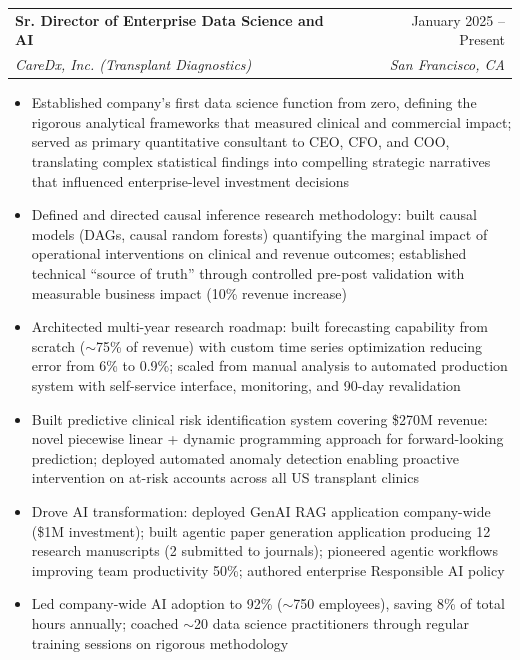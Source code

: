 \documentclass[letterpaper,11pt]{article}
\makeatletter
\newcommand{\resumeItem}[1]{
  \item\small{
    {#1 \vspace{-2pt}}
  }
}
\newcommand{\resumeSubheading}[4]{
  \vspace{-2pt}\item
    \begin{tabular*}{0.97\textwidth}[t]{l@{\extracolsep{\fill}}r}
      \textbf{#1} & #2 \\
      \textit{\small#3} & \textit{\small #4} \\
    \end{tabular*}\vspace{-7pt}
}
\newcommand{\resumeItemListStart}{\begin{itemize}}
\newcommand{\resumeItemListEnd}{\end{itemize}\vspace{-5pt}}
\makeatother
\begin{document}
    \resumeSubheading
      {Sr. Director of Enterprise Data Science and AI}{January 2025 -- Present}
      {CareDx, Inc. (Transplant Diagnostics)}{San Francisco, CA}
      \resumeItemListStart
        \resumeItem{Established company's first data science function from zero, defining the rigorous analytical frameworks that measured clinical and commercial impact; served as primary quantitative consultant to CEO, CFO, and COO, translating complex statistical findings into compelling strategic narratives that influenced enterprise-level investment decisions}
        \resumeItem{Defined and directed causal inference research methodology: built causal models (DAGs, causal random forests) quantifying the marginal impact of operational interventions on clinical and revenue outcomes; established technical ``source of truth'' through controlled pre-post validation with measurable business impact (10\% revenue increase)}
        \resumeItem{Architected multi-year research roadmap: built forecasting capability from scratch ($\sim$75\% of revenue) with custom time series optimization reducing error from 6\% to 0.9\%; scaled from manual analysis to automated production system with self-service interface, monitoring, and 90-day revalidation}
        \resumeItem{Built predictive clinical risk identification system covering \$270M revenue: novel piecewise linear + dynamic programming approach for forward-looking prediction; deployed automated anomaly detection enabling proactive intervention on at-risk accounts across all US transplant clinics}
        \resumeItem{Drove AI transformation: deployed GenAI RAG application company-wide (\$1M investment); built agentic paper generation application producing 12 research manuscripts (2 submitted to journals); pioneered agentic workflows improving team productivity 50\%; authored enterprise Responsible AI policy}
        \resumeItem{Led company-wide AI adoption to 92\% ($\sim$750 employees), saving 8\% of total hours annually; coached $\sim$20 data science practitioners through regular training sessions on rigorous methodology}
      \resumeItemListEnd
\end{document}
